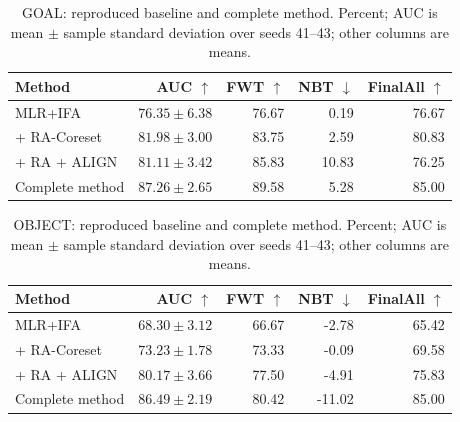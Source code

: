 \begin{table}[tb]
\centering\small
\caption{GOAL: reproduced baseline and complete method. Percent; AUC is mean $\pm$ sample standard deviation over seeds 41--43; other columns are means.}\label{tab:main-GOAL}
\begin{tabular}{lrrrr}
\toprule
Method & AUC $\uparrow$ & FWT $\uparrow$ & NBT $\downarrow$ & FinalAll $\uparrow$ \\
\midrule
MLR+IFA & $76.35\pm6.38$ & 76.67 & 0.19 & 76.67 \\
+ RA-Coreset & $81.98\pm3.00$ & 83.75 & 2.59 & 80.83 \\
+ RA + ALIGN & $81.11\pm3.42$ & 85.83 & 10.83 & 76.25 \\
Complete method & $87.26\pm2.65$ & 89.58 & 5.28 & 85.00 \\
\bottomrule
\end{tabular}
\end{table}

\begin{table}[tb]
\centering\small
\caption{OBJECT: reproduced baseline and complete method. Percent; AUC is mean $\pm$ sample standard deviation over seeds 41--43; other columns are means.}\label{tab:main-OBJECT}
\begin{tabular}{lrrrr}
\toprule
Method & AUC $\uparrow$ & FWT $\uparrow$ & NBT $\downarrow$ & FinalAll $\uparrow$ \\
\midrule
MLR+IFA & $68.30\pm3.12$ & 66.67 & -2.78 & 65.42 \\
+ RA-Coreset & $73.23\pm1.78$ & 73.33 & -0.09 & 69.58 \\
+ RA + ALIGN & $80.17\pm3.66$ & 77.50 & -4.91 & 75.83 \\
Complete method & $86.49\pm2.19$ & 80.42 & -11.02 & 85.00 \\
\bottomrule
\end{tabular}
\end{table}
